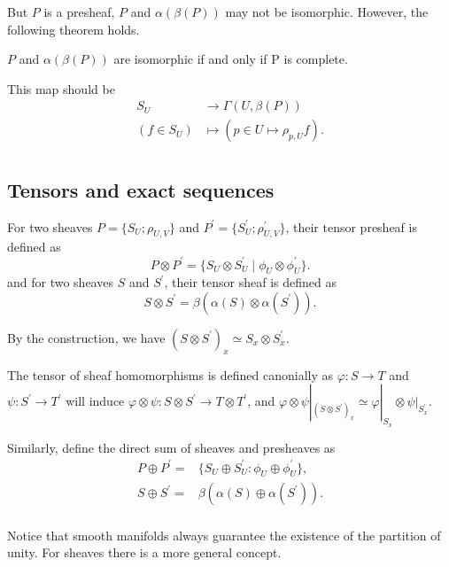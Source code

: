 \documentclass[twoside]{article}
\begin{document}
 But $P$ is a presheaf, $P$ and $\alpha(\beta(P))$ may not be isomorphic. However, the following theorem holds.

 \begin{theorem}
   $P$ and $\alpha(\beta(P))$ are isomorphic if and only if P is complete.
 \end{theorem}

  This map should be
  $$
  \begin{aligned}
    S_U&\to \Gamma(U,\beta(P))\\
    (f\in S_U)&\mapsto (p\in U\mapsto \rho_{p,U}f).\\
  \end{aligned}
  $$

\subsection{Tensors and exact sequences}


\begin{definition}

For two sheaves $P=\{S_U;\rho_{U,V}\}$ and $P^\prime=\{S_U^\prime;\rho_{U,V}^\prime\}$, their tensor presheaf is defined as $$
P\otimes P^\prime=\{S_U\otimes S_U^\prime\mid  \phi_U\otimes \phi_{U}^\prime\}.
$$
and for two sheaves $S$ and $S^\prime$, their tensor sheaf is defined as   $$S\otimes S^\prime=\beta(\alpha(S)\otimes \alpha(S^\prime)).$$

\end{definition}


By the construction, we have $(S\otimes S^\prime)_x\simeq S_x\otimes S_x^\prime$.

The tensor of sheaf homomorphisms is defined canonially as $\varphi\colon S\to T$ and $\psi\colon S^\prime\to T^\prime$ will induce $\varphi\otimes \psi\colon S\otimes S^\prime\to T\otimes T^\prime$, and $\varphi\otimes \psi|_{(S\otimes S^\prime)_x}\simeq \varphi|_{S_x}\otimes \psi|_{S_x^\prime}$.

Similarly,  define the direct sum of sheaves and presheaves as $$\begin{aligned}
P\oplus P^\prime=&\{S_U\oplus S_U^\prime\colon \phi_U\oplus \phi_{U}^\prime\},\\
S\oplus S^\prime=&\beta(\alpha(S)\oplus \alpha(S^\prime)).\\
\end{aligned}
$$


Notice that smooth manifolds always guarantee the existence of   the partition of unity. For sheaves there is  a more general concept.
\end{document}
